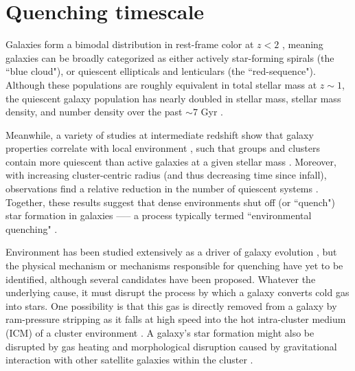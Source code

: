 \chapter{Quenching timescale}

\newcommand\mynote[1]{\textcolor{red}{#1}}
\newcommand\persnote[1]{\textcolor{green}{#1}}
\newcommand\tq[3]{#1\substack{+#2 \\ -#3}}
\newcommand\hiresult{$\tq{1.24}{0.23}{0.20}\ $}
\newcommand\htd{$\tq{0.94}{0.20}{0.18}$}
\newcommand\htf{ $\tq{0.29}{0.14}{0.15}$}
\newcommand\gresult{$\tq{1.50}{0.19}{0.18}\ $}
\newcommand\gtd{$\tq{0.69}{0.13}{0.13}$}
\newcommand\gtf{$\tq{0.80}{0.15}{0.18}$}
\newcommand\simhiresult{\sim1.2}
\newcommand\simgresult{\sim1.5}
\newcommand{\rpm}{\raisebox{.2ex}{$\scriptstyle\pm$}}

\def\changemargin#1#2{\list{}{\rightmargin#2\leftmargin#1}\item[]}
\let\endchangemargin=\endlist
    
Galaxies form a bimodal distribution in rest-frame color at $z < 2$ \citep{Strateva:2001aa,Baldry:2004aa,Bell:2004aa,Williams:2009tt}, meaning galaxies can be broadly categorized as either actively star-forming spirals (the ``blue cloud"), or quiescent ellipticals and lenticulars (the ``red-sequence").
Although these populations are roughly equivalent in total stellar mass at $z\sim1$, the quiescent galaxy population has nearly doubled in stellar mass, stellar mass density, and number density over the past $\sim7$ Gyr \citep{Arnouts:2007aa,Bell:2004aa,Borch:2006aa,Bundy:2006aa,Brown:2007aa,Faber:2007aa}.

Meanwhile, a variety of studies at intermediate redshift show that galaxy properties correlate with local environment \citep{Cooper:2006aa,Cooper:2007aa,Quadri:2007aa,Patel:2009aa}, such that groups and clusters contain more quiescent than active galaxies at a given stellar mass \citep{George:2011aa,Muzzin:2012dw,Presotto:2012aa,Tanaka:2012aa,Nantais:2017aa}.
Moreover, with increasing cluster-centric radius (and thus decreasing time since infall), observations find a relative reduction in the number of quiescent systems \cite[e.g.][]{Presotto:2012aa}.
Together, these results suggest that dense environments shut off (or ``quench") star formation in galaxies —-- a process typically termed ``environmental quenching" \citep{Peng:2010aa}.

Environment has been studied extensively as a driver of galaxy evolution \citep[for a review see][]{Blanton:2009aa}, but the physical mechanism or mechanisms responsible for quenching have yet to be identified, although several candidates have been proposed.
Whatever the underlying cause, it must disrupt the process by which a galaxy converts cold gas into stars.
One possibility is that this gas is directly removed from a galaxy by ram-pressure stripping as it falls at high speed into the hot intra-cluster medium (ICM) of a cluster environment \citep{Gunn:1972aa}.
A galaxy's star formation might also be disrupted by gas heating and morphological disruption caused by gravitational interaction with other satellite galaxies within the cluster \citep[``harassment", see][]{Moore:1996aa}.

